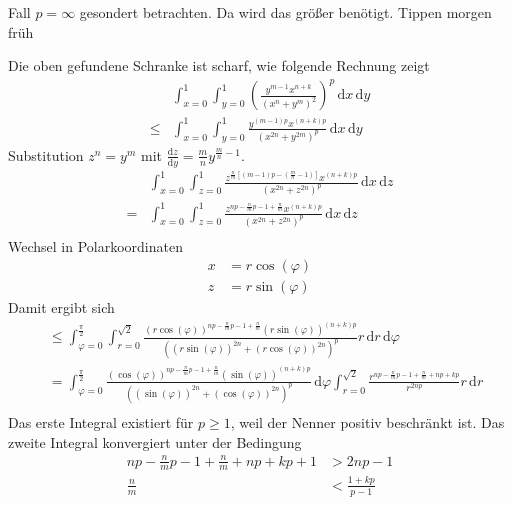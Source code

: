 \documentclass[10pt,a4paper,oneside]{report}
\begin{document}
Fall $p = \infty$ gesondert betrachten. Da wird das größer benötigt.
Tippen morgen früh

Die oben gefundene Schranke ist scharf, wie folgende Rechnung zeigt
\begin{align*}
&\int_{x=0}^{1} \int_{y=0}^{1} \left( \frac{y^{m-1}x^{n+k}}{\left(x^n+y^m\right)^2} \right)^p \, \mathrm{d}x \, \mathrm{d}y \\
\leq &\int_{x=0}^{1} \int_{y=0}^{1} \frac{y^{\left(m-1\right)p}x^{\left(n+k\right)p}}{\left(x^{2n}+y^{2m}\right)^p}  \, \mathrm{d}x \, \mathrm{d}y 
\end{align*}
Substitution $z^n = y^m$ mit $\frac{\mathrm{d}z}{\mathrm{d}y} = \frac{m}{n} y^{\frac{m}{n} - 1}$.
\begin{align*}
&\int_{x=0}^{1} \int_{z=0}^{1} \frac{z^{\frac{n}{m}\left[\left(m-1\right)p - \left(\frac{m}{n} - 1\right)\right]}x^{\left(n+k\right)p}}{\left(x^{2n}+z^{2n}\right)^p}  \, \mathrm{d}x \, \mathrm{d}z \\
= &\int_{x=0}^{1} \int_{z=0}^{1} \frac{z^{np-\frac{n}{m}p-1+\frac{n}{m}}x^{\left(n+k\right)p}}{\left(x^{2n}+z^{2n}\right)^p}  \, \mathrm{d}x \, \mathrm{d}z \\
\end{align*}
Wechsel in Polarkoordinaten
\begin{align*}
x &= r \cos \left( \varphi \right) \\
z &= r \sin \left( \varphi \right)
\end{align*}
Damit ergibt sich 
\begin{align*}
&\leq \int_{\varphi=0}^{\frac{\pi}{2}} \int_{r=0}^{\sqrt{2}} \frac{\left(r \cos\left(\varphi\right)\right)^{np-\frac{n}{m}p-1+\frac{n}{m}}\left(r \sin\left(\varphi\right)\right)^{\left(n+k\right)p}}{\left(\left(r \sin\left(\varphi\right)\right)^{2n}+\left(r \cos\left(\varphi\right)\right)^{2n}\right)^p}  r \, \mathrm{d}r \, \mathrm{d}\varphi \\
&= \int_{\varphi=0}^{\frac{\pi}{2}} 
\frac{\left( \cos \left(\varphi\right)\right)^{np-\frac{n}{m}p-1+\frac{n}{m}} 
\left( \sin \left(\varphi\right)\right)^{\left(n+k\right)p}}
{\left(\left(\sin\left(\varphi\right)\right)^{2n}+\left(\cos\left(\varphi\right)\right)^{2n}\right)^p} \, \mathrm{d}\varphi 
\int_{r=0}^{\sqrt{2}} \frac{r^{np-\frac{n}{m}p-1+\frac{n}{m}+np+kp}}{r^{2np}}  r \, \mathrm{d}r \\
\end{align*}
Das erste Integral existiert für $p\geq 1$, weil der Nenner positiv beschränkt ist.
Das zweite Integral konvergiert unter der Bedingung
\begin{align*}
np-\frac{n}{m}p-1+\frac{n}{m}+np+kp + 1 &> 2np-1 \\
\frac{n}{m} &< \frac{1+kp}{p-1}
\end{align*}
\end{document}
